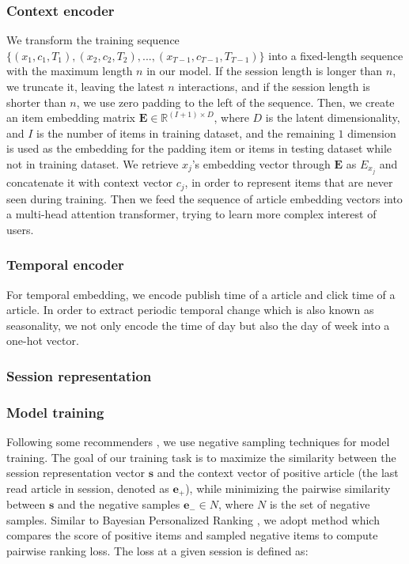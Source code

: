 \subsubsection{Context encoder}
We transform the training sequence $\{(x_1,c_1,T_1),(x_2,c_2,T_2),...,(x_{T-1},c_{T-1},T_{T-1})\}$ into a fixed-length sequence with the maximum length $n$ in our model. If the session length is longer than $n$, we truncate it, leaving the latest $n$ interactions, and if the session length is shorter than $n$, we use zero padding to the left of the sequence. Then, we create an item embedding matrix $\mathbf{E}\in \mathbb{R}^{(I+1)\times D}$, where $D$ is the latent dimensionality, and $I$ is the number of items in training dataset, and the remaining $1$ dimension is used as the embedding for the padding item or items in testing dataset while not in training dataset. We retrieve $x_j$'s embedding vector through $\mathbf{E}$ as $E_{x_j}$ and concatenate it with context vector $c_j$, in order to represent items that are never seen during training. Then we feed the sequence of article embedding vectors into a multi-head attention transformer, trying to learn more complex interest of users. 

\subsubsection{Temporal encoder}
For temporal embedding, we encode publish time of a article and click time of a article. In order to extract periodic temporal change which is also known as seasonality, we not only encode the time of day but also the day of week into a one-hot vector. 

\subsubsection{Session representation}

\subsubsection{Model training}
Following some recommenders \cite{wu_neural_2019, wu_neural_2019-1}, we use negative sampling techniques for model training. The goal of our training task is to maximize the similarity between the session representation vector $\mathbf{s}$
and the context vector of positive article (the last read article in session, denoted as $\mathbf{e_{+}}$), while minimizing the pairwise similarity between $\mathbf{s}$ and the negative samples $\mathbf{e_{-}}\in N$, where $N$ is the set of negative samples.  Similar to Bayesian Personalized Ranking \cite{Rendle2009BPR}, we adopt method which compares the score of positive items and sampled negative items to compute pairwise ranking loss. The loss at a given session is defined as: 

